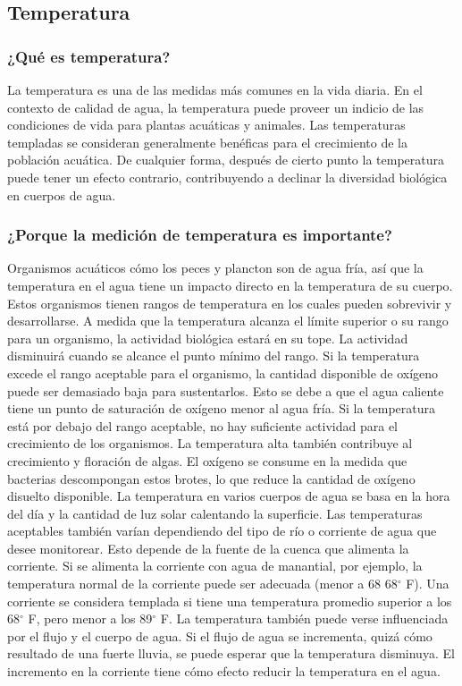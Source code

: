 \subsection{Temperatura}
\subsubsection{¿Qué es temperatura?}
La temperatura es una de las medidas más comunes en la vida diaria. 
En el contexto de calidad de agua, la temperatura puede proveer un indicio de las condiciones de vida para plantas acuáticas y animales.  
Las temperaturas templadas se consideran generalmente benéficas para el crecimiento de la población acuática. 
De cualquier forma, después de cierto punto la temperatura puede tener un efecto contrario, contribuyendo a declinar la diversidad biológica en cuerpos de agua.

\subsubsection{¿Porque la medición de temperatura es importante?}
Organismos acuáticos cómo los peces y plancton son de agua fría, así que la temperatura en el agua tiene un impacto directo en la temperatura de su cuerpo. 
Estos organismos tienen rangos de temperatura en los cuales pueden sobrevivir y desarrollarse. 
A medida que la temperatura alcanza el límite superior o su rango para un organismo, la actividad biológica estará en su tope. 
La actividad disminuirá cuando se alcance el punto mínimo del rango. 
Si la temperatura excede el rango aceptable para el organismo, la cantidad disponible de oxígeno puede ser demasiado baja para sustentarlos. 
Esto se debe a que el agua caliente tiene un punto de saturación de ox\'igeno menor al agua fría. 
Si la temperatura está por debajo del rango aceptable, no hay suficiente actividad para el crecimiento de los organismos. 
La temperatura alta también contribuye al crecimiento y floración de algas. 
El oxígeno se consume en la medida que bacterias descompongan estos brotes, lo que reduce la cantidad de oxígeno disuelto disponible.
La temperatura en varios cuerpos de agua se basa en la hora del día y la cantidad de luz solar calentando la superficie. 
Las temperaturas aceptables también varían dependiendo del tipo de río o corriente de agua que desee monitorear. 
Esto depende de la fuente de la cuenca que alimenta la corriente. 
Si se alimenta la corriente con agua de manantial, por ejemplo, la temperatura normal de la corriente puede ser adecuada (menor a 68 68$^\circ$ F). 
Una corriente se considera templada si tiene una temperatura promedio superior a los 68$^\circ$ F, pero menor a los 89$^\circ$ F. 
La temperatura también puede verse influenciada por el flujo y el cuerpo de agua. 
Si el flujo de agua se incrementa, quizá cómo resultado de una fuerte lluvia, se puede esperar que la temperatura disminuya. 
El incremento en la corriente tiene cómo efecto reducir la temperatura en el agua.


